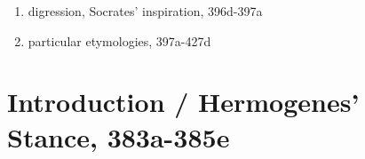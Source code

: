 \documentclass[12pt]{article}
\begin{document}
\begin{small}
\begin{enumerate}
\begin{enumerate}
\begin{enumerate}
\begin{enumerate}
\begin{enumerate}
                \item rule setter uses patterns to embody sounds, 389b-390b
                \end{enumerate}
            \item instructors give specifications to rule-makers, 390b-391a
            \end{enumerate}
        \item judging the correctness of names from Homer, 391a-396d
            \begin{enumerate}
            \item divine versus mortal names (rivers), 391d-392b
            \item divergent human names (Hector, Agamemnon, others), 392b-396d
            \item inheriting names, 393b-395d
                \begin{enumerate}
                \item names can be modified w/o meaning change, 393d-393e
                \end{enumerate}
            \item Zeus etymology 1, 395d-396d
            \end{enumerate}
        \end{enumerate}
    \end{enumerate}
\item digression, Socrates' inspiration, 396d-397a
\item particular etymologies, 397a-427d
\end{enumerate}
\end{small}

\section{Introduction / Hermogenes' Stance, 383a-385e}
\end{document}
